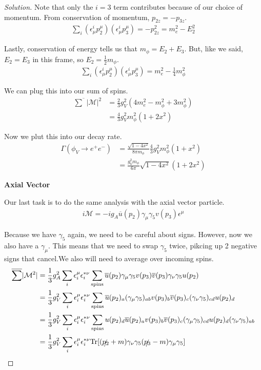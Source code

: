 \documentclass[12pt]{article}
\newenvironment{solution}{\begin{proof}[Solution]}{\end{proof}}
\begin{document}
\begin{solution}
Note that only the $i=3$ term contributes because of our choice of momentum. From conservation of momentum, $p_{2z}=-p_{3z}$.
\begin{align*}
    \sum_i(\epsilon_\mu^ip_2^\mu)(\epsilon_\mu^ip_3^\mu)=-p_{2z}^2=m_e^2-E_2^2
\end{align*}

Lastly, conservation of energy tells us that $m_\phi=E_2+E_3$. But, like we said, $E_2=E_3$ in this frame, so $E_2=\frac{1}{2}m_\phi$.
\begin{align*}
    \sum_i(\epsilon_\mu^ip_2^\mu)(\epsilon_\mu^ip_3^\mu)=m_e^2-\frac{1}{4}m_\phi^2
\end{align*}

We can plug this into our sum of spins.
\begin{align*}
    \overline{\sum}|\mathcal{M}|^2&=\frac{2}{3}g_V^2(4m_e^2-m_\phi^2+3m_\phi^2) \\
    &=\frac{4}{3}g_V^2m_\phi^2(1+2x^2)
\end{align*}

Now we plut this into our decay rate.
\begin{align*}
    \Gamma(\phi_V\rightarrow e^+e^-)&=\frac{\sqrt{1-4x^2}}{8\pi m_\phi}\frac{4}{3}g_V^2m_\phi^2(1+x^2) \\
    &= \frac{g_V^2m_\phi}{6\pi}\sqrt{1-4x^2}(1+2x^2)
\end{align*}

\textbf{Axial Vector}

Our last task is to do the same analysis with the axial vector particle.
\begin{align*}
    i\mathcal{M}=-ig_A\overline{u}(p_2)\gamma_\mu \gamma_5 v(p_3) \epsilon^\mu
\end{align*}

Because we have $\gamma_5$ again, we need to be careful about signs. However, now we also have a $\gamma_\mu$. This means that we need to swap $\gamma_5$ twice, pikcing up 2 negative signs that cancel.We also will need to average over incoming spins.
\begin{align*}
    \overline{\sum}|\mathcal{M}^2|&=\frac{1}{3}g_A^2\sum_i\epsilon_i^\mu \epsilon_i^{*\nu}\sum_\text{spins}\overline{u}(p_2)\gamma_\mu \gamma_5 v(p_3)\overline{v}(p_3)\gamma_\nu \gamma_5 u(p_2) \\
    &= \frac{1}{3}g_V^2\sum_i\epsilon_i^\mu \epsilon_i^{*\nu}\sum_{\text{spins}}\overline{u}(p_2)_a(\gamma_\mu\gamma_5)_{ab} v(p_3)_b \overline{v}(p_3)_c (\gamma_\nu\gamma_5)_{cd}u(p_2)_d \\
    &= \frac{1}{3}g_V^2\sum_i\epsilon_i^\mu \epsilon_i^{*\nu}\sum_{\text{spins}}u(p_2)_d\overline{u}(p_2)_av(p_3)_b \overline{v}(p_3)_c(\gamma_\mu\gamma_5)_{cd}u(p_2)_d(\gamma_\nu\gamma_5)_{ab} \\
    &= \frac{1}{3}g_V^2\sum_i\epsilon_i^\mu \epsilon_i^{*\nu}\text{Tr}[(\slashed{p_2}+m)\gamma_\nu\gamma_5 (\slashed{p_3}-m)\gamma_\mu\gamma_5]
\end{align*}


\end{solution}
\end{document}
